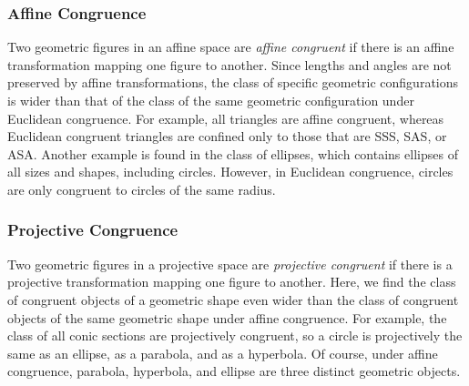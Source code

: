 \documentclass[12pt]{article}
\begin{document}
\subsubsection*{Affine Congruence}

Two geometric figures in an affine space are \emph{affine congruent} if there is an affine transformation mapping one figure to another.
Since lengths and angles are not preserved by affine transformations, the class of specific geometric configurations is wider
than that of the class of the same geometric configuration under Euclidean congruence.  For example, all triangles are
affine congruent, whereas Euclidean congruent triangles are confined only to those that are SSS, SAS, or ASA.  Another
example is found in the class of ellipses, which contains ellipses of all sizes and shapes, including circles.  However, in
Euclidean congruence, circles are only congruent to circles of the same radius.

\subsubsection*{Projective Congruence}

Two geometric figures in a projective space are \emph{projective congruent} if there is a projective transformation mapping one
figure to another.  Here, we find the class of congruent objects of a geometric shape even wider than the class of
congruent objects of the same geometric shape under affine congruence.  For example, the class of all conic sections are
projectively congruent, so a circle is projectively the same as an ellipse, as a parabola, and as a hyperbola.  Of course,
under affine congruence, parabola, hyperbola, and ellipse are three distinct geometric objects.
\end{document}
